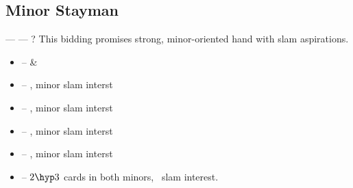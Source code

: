 \subsection{Minor Stayman}
\label{subsec:minor-stayman}

\begin{flushleft}
   ---  --- ? \linebreak
  This bidding promises strong, minor-oriented hand with slam aspirations.
\end{flushleft}
\begin{itemize}
  \item {} --  \& 
  \item {} -- , minor slam interst
  \item {} -- , minor slam interst
  \item {} -- , minor slam interst
  \item {} -- , minor slam interst
  \item {} -- $2\hyp 3$ cards in both minors, \no\ slam interest.
\end{itemize}
